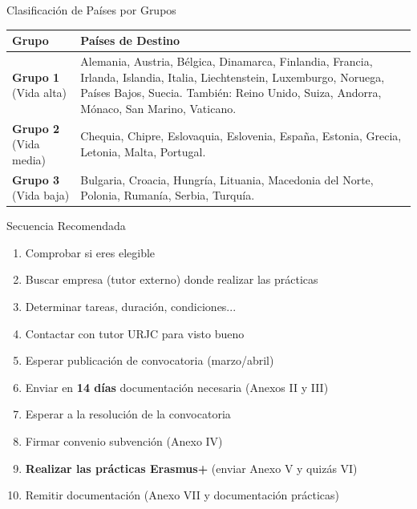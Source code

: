 \begin{frame}{Clasificación de Países por Grupos}
    \small
    \begin{table}
        \centering
        \begin{tabular}{|p{1.8cm}|p{8.5cm}|}
            \hline
            \textbf{Grupo} & \textbf{Países de Destino} \\ \hline
            \textbf{Grupo 1} (Vida alta) & Alemania, Austria, Bélgica, Dinamarca, Finlandia, Francia, Irlanda, Islandia, Italia, Liechtenstein, Luxemburgo, Noruega, Países Bajos, Suecia. También: Reino Unido, Suiza, Andorra, Mónaco, San Marino, Vaticano. \\ \hline
            \textbf{Grupo 2} (Vida media) & Chequia, Chipre, Eslovaquia, Eslovenia, España, Estonia, Grecia, Letonia, Malta, Portugal. \\ \hline
            \textbf{Grupo 3} (Vida baja) & Bulgaria, Croacia, Hungría, Lituania, Macedonia del Norte, Polonia, Rumanía, Serbia, Turquía. \\ \hline
        \end{tabular}
    \end{table}
\end{frame}

\begin{frame}{Secuencia Recomendada}

    \begin{enumerate}
        \item Comprobar si eres elegible
        \item Buscar empresa (tutor externo) donde realizar las prácticas
        \item Determinar tareas, duración, condiciones...
        \item Contactar con tutor URJC para visto bueno
        \item Esperar publicación de convocatoria (marzo/abril)
        \item Enviar en {\bf 14 días} documentación necesaria (Anexos II y III)
        \item Esperar a la resolución de la convocatoria
        \item Firmar convenio subvención (Anexo IV)
        \item {\bf Realizar las prácticas Erasmus+} (enviar Anexo V y quizás VI)
        \item Remitir documentación (Anexo VII y documentación prácticas)
    \end{enumerate}
\end{frame}

